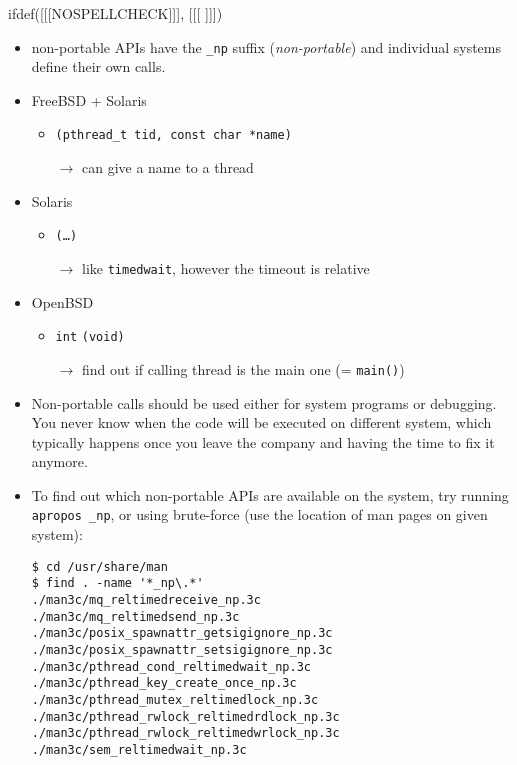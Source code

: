 
ifdef([[[NOSPELLCHECK]]], [[[
]]])

\begin{slide}

\begin{itemize}
\item non-portable APIs have the \texttt{\_np} suffix (\emph{non-portable}) and
individual systems define their own calls.

\item FreeBSD + Solaris
\begin{itemize}
\item {}\texttt{(pthread\_t tid, const char *name)}
\item[$\rightarrow$] can give a name to a thread
\end{itemize}

\item Solaris
\begin{itemize}
\item {}\texttt{(\dots)}
\item[$\rightarrow$] like \texttt{timedwait}, however the timeout is relative
\end{itemize}

\item OpenBSD
\begin{itemize}
\item \texttt{int} \texttt{(void)}
\item[$\rightarrow$] find out if calling thread is the main one
(= \texttt{main()})
\end{itemize}

\end{itemize}
\end{slide}

\begin{itemize}
\item Non-portable calls should be used either for system programs or
debugging. You never know when the code will be executed on different system,
which typically happens once you leave the company and having the time to
fix it anymore.
\item To find out which non-portable APIs are available on the system,
try running \texttt{apropos \_np}, or using brute-force (use the location
of man pages on given system):
\begin{verbatim}
$ cd /usr/share/man
$ find . -name '*_np\.*'
./man3c/mq_reltimedreceive_np.3c
./man3c/mq_reltimedsend_np.3c
./man3c/posix_spawnattr_getsigignore_np.3c
./man3c/posix_spawnattr_setsigignore_np.3c
./man3c/pthread_cond_reltimedwait_np.3c
./man3c/pthread_key_create_once_np.3c
./man3c/pthread_mutex_reltimedlock_np.3c
./man3c/pthread_rwlock_reltimedrdlock_np.3c
./man3c/pthread_rwlock_reltimedwrlock_np.3c
./man3c/sem_reltimedwait_np.3c
\end{verbatim}
\end{itemize}

\pagebreak

\endinput
